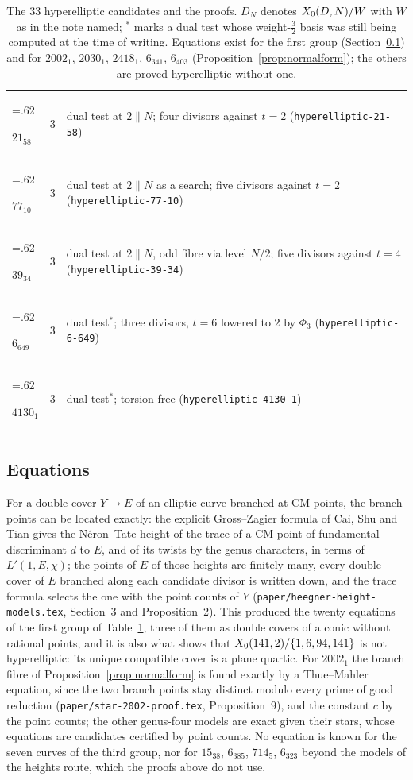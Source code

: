 \begin{table}[ht]
\begin{tabularx}{\textwidth}{>{\hsize=.62\hsize\raggedright\arraybackslash}Xc>{\hsize=1.38\hsize\raggedright\arraybackslash}X}
$21_{58}$ & 3 & dual test at $2\parallel N$; four divisors against $t=2$ (\texttt{hyperelliptic-21-58})\\
$77_{10}$ & 3 & dual test at $2\parallel N$ as a search; five divisors against $t=2$ (\texttt{hyperelliptic-77-10})\\
$39_{34}$ & 3 & dual test at $2\parallel N$, odd fibre via level $N/2$; five divisors against $t=4$ (\texttt{hyperelliptic-39-34})\\
$6_{649}$ & 3 & dual test$^*$; three divisors, $t=6$ lowered to $2$ by $\Phi_3$ (\texttt{hyperelliptic-6-649})\\
$4130_1$ & 3 & dual test$^*$; torsion-free (\texttt{hyperelliptic-4130-1})\\
\hline
\end{tabularx}
\caption{The $33$ hyperelliptic candidates and the proofs. $D_N$ denotes $X_0({D},{N})/W$ with $W$ as in the
note named; $^*$ marks a dual test whose weight-$\tfrac32$ basis was still being computed at the time of
writing. Equations exist for the first group (Section~\ref{sec:candidates-heights}) and for $2002_1$,
$2030_1$, $2418_1$, $6_{341}$, $6_{403}$ (Proposition~\ref{prop:normalform}); the others are proved
hyperelliptic without one.}
\label{tab:candidates}
\end{table}

\subsection{Equations}\label{sec:candidates-heights}

For a double cover $Y\to E$ of an elliptic curve branched at CM points, the branch points can be located
exactly: the explicit Gross--Zagier formula of Cai, Shu and Tian gives the N\'eron--Tate height of the trace of a
CM point of fundamental discriminant $d$ to $E$, and of its twists by the genus characters, in terms of
$L'(1,E,\chi)$; the points of $E$ of those heights are finitely many, every double cover of $E$ branched along
each candidate divisor is written down, and the trace formula selects the one with the point counts of $Y$
(\texttt{paper/heegner-height-models.tex}, Section~3 and Proposition~2). This produced the twenty equations of
the first group of Table~\ref{tab:candidates}, three of them as double covers of a conic without rational
points, and it is also what shows that $X_0({141},{2})/\{1,6,94,141\}$ is not hyperelliptic: its unique
compatible cover is a plane quartic. For $2002_1$ the branch fibre of Proposition~\ref{prop:normalform} is
found exactly by a Thue--Mahler equation, since the two branch points stay distinct modulo every prime of good
reduction (\texttt{paper/star-2002-proof.tex}, Proposition~9), and the constant $c$ by the point counts; the
other genus-four models are exact given their stars, whose equations are candidates certified by point counts.
No equation is known for the seven curves of the third group, nor for $15_{38}$, $6_{385}$, $714_5$, $6_{323}$
beyond the models of the heights route, which the proofs above do not use.
